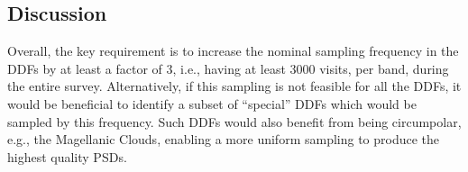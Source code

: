 %
%
%
%

\subsection{Discussion}
\label{sec:\secname:discussion}


Overall, the key requirement is to increase the nominal sampling frequency
in the DDFs by at least a factor of 3, i.e., having at least 3000 visits,
per band, during the entire survey. Alternatively, if this sampling is not
feasible for all the DDFs, it would be beneficial to identify a subset of
``special'' DDFs which would be sampled by this frequency. Such DDFs would
also benefit from being circumpolar, e.g., the Magellanic Clouds, enabling
a more uniform sampling to produce the highest quality PSDs.


\navigationbar
